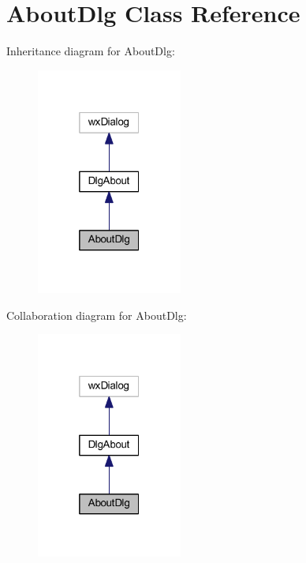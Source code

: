 \hypertarget{class_about_dlg}{\section{About\-Dlg Class Reference}
\label{class_about_dlg}
}


Inheritance diagram for About\-Dlg\-:\nopagebreak
\begin{figure}[H]
\begin{center}
\leavevmode
\includegraphics[width=136pt]{class_about_dlg__inherit__graph}
\end{center}
\end{figure}


Collaboration diagram for About\-Dlg\-:\nopagebreak
\begin{figure}[H]
\begin{center}
\leavevmode
\includegraphics[width=136pt]{class_about_dlg__coll__graph}
\end{center}
\end{figure}
